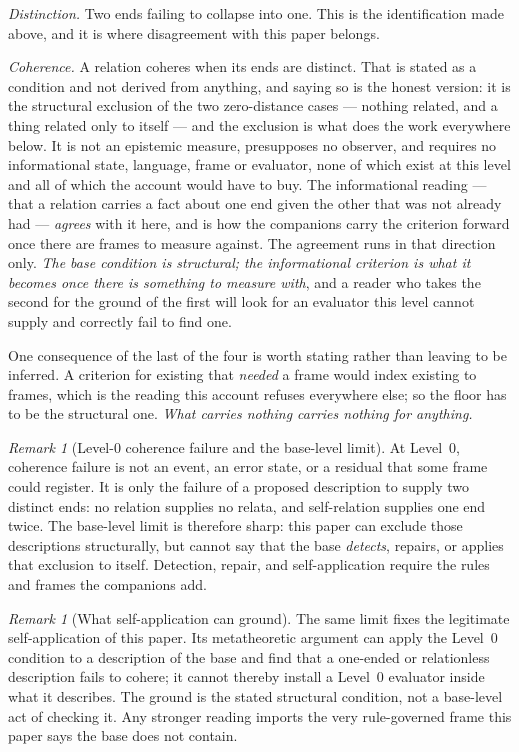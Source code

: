 \documentclass[11pt,a4paper]{article}
\theoremstyle{remark}\newtheorem{remark}[proposition]{Remark}
\begin{document}
\emph{Distinction.} Two ends failing to collapse into one. This is the identification made above, and
it is where disagreement with this paper belongs.

\emph{Coherence.} A relation coheres when its ends are distinct. That is stated as a condition and
not derived from anything, and saying so is the honest version: it is the structural exclusion of the
two zero-distance cases --- nothing related, and a thing related only to itself --- and the exclusion
is what does the work everywhere below. It is not an epistemic measure, presupposes no observer, and
requires no informational state, language, frame or evaluator, none of which exist at this level and
all of which the account would have to buy. The informational reading --- that a relation carries a
fact about one end given the other that was not already had --- \emph{agrees} with it here, and is how
the companions carry the criterion forward once there are frames to measure against. The agreement runs
in that direction only. \emph{The base condition is structural; the informational criterion is what it
becomes once there is something to measure with}, and a reader who takes the second for the ground of
the first will look for an evaluator this level cannot supply and correctly fail to find one.

One consequence of the last of the four is worth stating rather than leaving to be inferred. A criterion for
existing that \emph{needed} a frame would index existing to frames, which is the reading this account
refuses everywhere else; so the floor has to be the structural one. \emph{What carries nothing carries
nothing for anything.}

\begin{remark}[Level-0 coherence failure and the base-level limit]\label{rem:level0-limit}
At Level~0, coherence failure is not an event, an error state, or a residual that some frame could
register. It is only the failure of a proposed description to supply two distinct ends: no relation
supplies no relata, and self-relation supplies one end twice. The base-level limit is therefore sharp:
this paper can exclude those descriptions structurally, but cannot say that the base \emph{detects},
repairs, or applies that exclusion to itself. Detection, repair, and self-application require the
rules and frames the companions add.
\end{remark}

\begin{remark}[What self-application can ground]\label{rem:self-application-grounds}
The same limit fixes the legitimate self-application of this paper. Its metatheoretic argument can
apply the Level~0 condition to a description of the base and find that a one-ended or relationless
description fails to cohere; it cannot thereby install a Level~0 evaluator inside what it describes.
The ground is the stated structural condition, not a base-level act of checking it. Any stronger
reading imports the very rule-governed frame this paper says the base does not contain.
\end{remark}
\end{document}

